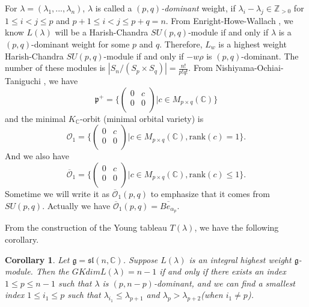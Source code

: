 \documentclass{amsart}[12pt]
\newtheorem{Cor}{Corollary}[section]
\numberwithin{equation}{section}
\begin{document}
For $\lambda=(\lambda_1,...,\lambda_n)$, $ \lambda $ is called a \textit{$ (p,q) $-dominant} weight, if $ \lambda_i-\lambda_j\in\mathbb{Z}_{>0} $ for $ 1\leq i<j\leq p $ and $ p+1\leq i<j\leq p+q=n $. From Enright-Howe-Wallach \cite{EHW}, we know $L(\lambda)$ will be a Harish-Chandra $SU(p,q)$-module if and only if $ \lambda $ is  a $ (p,q) $-dominant weight for some $p$ and $q$. Therefore, $L_w$ is a highest weight Harish-Chandra $SU(p,q)$-module if and only if $-w\rho $ is  $ (p,q) $-dominant. The number of these modules is $|S_n/(S_p\times S_q)|=\frac{n!}{p!q!}$. From Nishiyama-Ochiai-Taniguchi \cite{NOT}, we have
$$\mathfrak{p}^+=\{\left(
\begin{array}{cc}
0 & c \\
0 & 0 \\
\end{array}
\right)|c\in M_{p\times q}(\mathbb{C}) \}$$
and
 the minimal $K_{\mathbb{C}}$-orbit (minimal orbital variety) is $$\mathcal{O}_1=\{\left(
	\begin{array}{cc}
	0 & c \\
	0 & 0 \\
	\end{array}
	\right)|c\in M_{p\times q}(\mathbb{C}), \text{rank}(c)=1 \}.$$
	And we also have $$\overline{\mathcal{O}}_1=\{\left(
	\begin{array}{cc}
	0 & c \\
	0 & 0 \\
	\end{array}
	\right)|c\in M_{p\times q}(\mathbb{C}), \text{rank}(c)\leq 1 \}.$$
	Sometime we will write it as $\overline{\mathcal{O}}_1(p,q)$ to emphasize that it comes from $SU(p,q)$. Actually we have $\overline{\mathcal{O}}_1(p,q)=\overline{Be_{\alpha_{p}}}$.




From the construction of  the Young tableau $T(\lambda)$, we have the following corollary.


\begin{Cor}\label{pq}
Let $ \mathfrak{g}=\mathfrak{sl}(n,\mathbb{C}) $. Suppose $L(\lambda)$ is an integral highest weight $\mathfrak{g}$-module. Then  the $GKdim L(\lambda)=n-1$  if and only if   there exists an  index $1\leq p\leq n-1$ such that $\lambda$ is  $ (p,n-p) $-dominant, and we can find a smallest index $1\leq i_1\leq p$ such that $\lambda_{i_1}\leq \lambda_{p+1}$ and $\lambda_{p}>\lambda_{p+2}$(when $i_1\neq p$).
\end{Cor}
\end{document}
